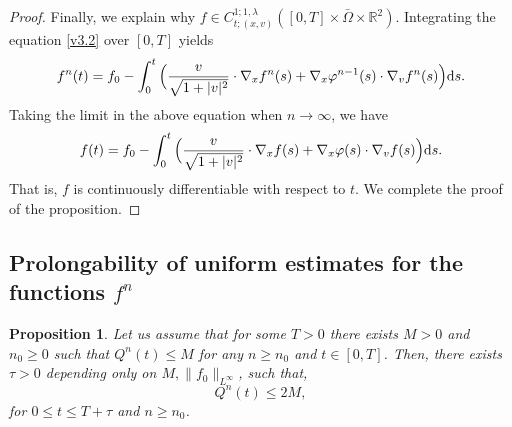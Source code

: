 \documentclass[11pt,reqno]{amsart}%
\newtheorem{Proposition}{Proposition}[section]
\theoremstyle{definition}
\theoremstyle{remark}
\begin{document}
\begin{proof}
Finally, we explain  why $f \in C^{1;1,\lambda}_{t;(x,v)}([0,T]\times \bar{\Omega}\times \mathbb{R}^{2})$. Integrating the equation \eqref{v3.2} over $[0,T]$ yields
$$ f^{n}(t)=f_{0}-\int^{t}_{0}\Big(\frac{v}{\sqrt{1+|v|^{2}}}\cdot\nabla_{x}f^{n}(s)+\nabla_{x}\varphi^{n-1}(s)\cdot\nabla_{v}f^{n}(s)\Big) {\rm d}s.$$
Taking the limit in the above equation when $n\rightarrow \infty$, we have
$$ f(t)=f_{0}-\int^{t}_{0}\Big(\frac{v}{\sqrt{1+|v|^{2}}}\cdot\nabla_{x}f(s)+\nabla_{x}\varphi(s)\cdot\nabla_{v}f(s)\Big) {\rm d}s.$$
That is,  $f$ is continuously differentiable with respect to $t$. We complete the proof of the proposition.
\end{proof}

\subsection{Prolongability of uniform estimates for the functions $f^{n}$}
\begin{Proposition}\label{P6}
Let us assume that for some $T>0$ there exists $M>0$ and $n_{0}\geq 0$ such that $Q^{n}(t) \leq M$  for any $n\geq n_{0}$ and $t\in [0,T]$. Then, there exists $\tau >0$ depending only on $M,\|f_{0}\|_{L^{\infty}}$, such that, 
$$Q^{n}(t) \leq 2M,$$
for $0\leq t\leq T+\tau$ and $n\geq n_{0}$.
\end{Proposition}
\end{document}

